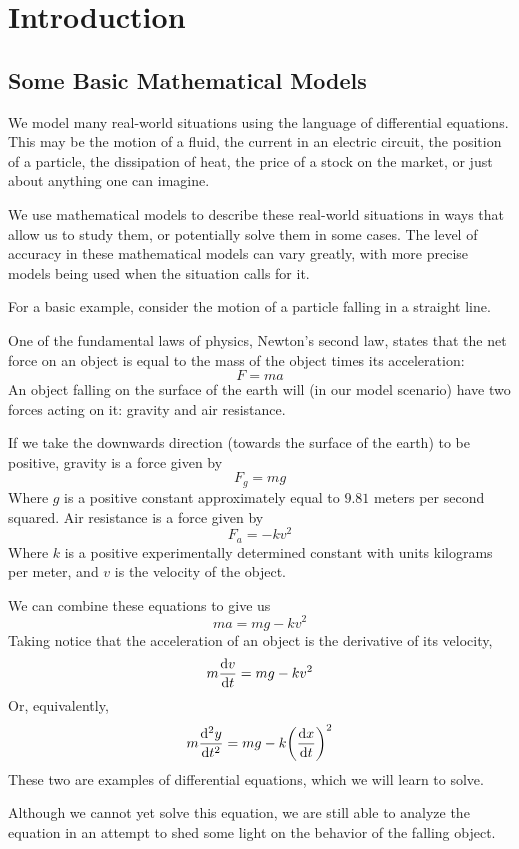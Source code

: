 \section{Introduction}
\subsection{Some Basic Mathematical Models}
We model many real-world situations using the language of differential equations. This may be the motion of a fluid, the current in an electric circuit, the position of a particle, the dissipation of heat, the price of a stock on the market, or just about anything one can imagine. \par
We use mathematical models to describe these real-world situations in ways that allow us to study them, or potentially solve them in some cases. The level of accuracy in these mathematical models can vary greatly, with more precise models being used when the situation calls for it. \par
For a basic example, consider the motion of a particle falling in a straight line. 
\begin{example}
    One of the fundamental laws of physics, Newton's second law, states that the net force on an object is equal to the mass of the object times its acceleration:
    \[ F = ma \]
    An object falling on the surface of the earth will (in our model scenario) have two forces acting on it: gravity and air resistance. \par
    If we take the downwards direction (towards the surface of the earth) to be positive, gravity is a force given by
    \[ F_g = mg \]
    Where $g$ is a positive constant approximately equal to $9.81$ meters per second squared. Air resistance is a force given by
    \[ F_a = -kv^2 \]
    Where $k$ is a positive experimentally determined constant with units kilograms per meter, and $v$ is the velocity of the object. \par
    We can combine these equations to give us
    \[ ma = mg - kv^2 \]
    Taking notice that the acceleration of an object is the derivative of its velocity,
    \[ m\dv{v}{t} = mg - kv^2 \]
    Or, equivalently,
    \[ m \dv[2]{y}{t} = mg - k\pqty{\dv{x}{t}}^2 \]
    These two are examples of differential equations, which we will learn to solve. \par
    Although we cannot yet solve this equation, we are still able to analyze the equation in an attempt to shed some light on the behavior of the falling object.
\end{example}
